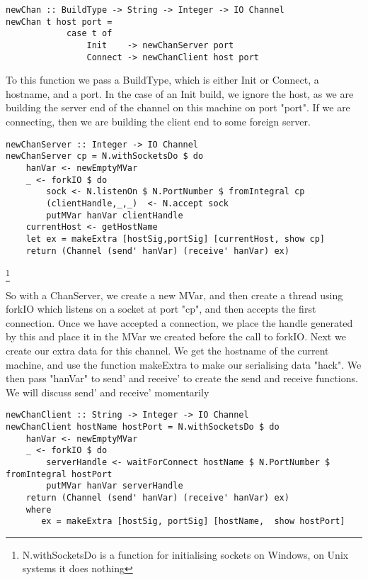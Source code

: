 \begin{verbatim}
newChan :: BuildType -> String -> Integer -> IO Channel
newChan t host port =
            case t of
                Init    -> newChanServer port
                Connect -> newChanClient host port
\end{verbatim}
To this function we pass a BuildType, which is either Init or Connect, a hostname, and a port. In the case of an Init build, we ignore the host, as we are building the server end of the channel on this machine on port "port". If we are connecting, then we are building the client end to some foreign server.

\begin{verbatim}
newChanServer :: Integer -> IO Channel
newChanServer cp = N.withSocketsDo $ do
    hanVar <- newEmptyMVar
    _ <- forkIO $ do
        sock <- N.listenOn $ N.PortNumber $ fromIntegral cp
        (clientHandle,_,_)  <- N.accept sock
        putMVar hanVar clientHandle
    currentHost <- getHostName
    let ex = makeExtra [hostSig,portSig] [currentHost, show cp]
    return (Channel (send' hanVar) (receive' hanVar) ex)
\end{verbatim}
\footnote{N.withSocketsDo is a function for initialising sockets on Windows, on Unix systems it does nothing}

So with a ChanServer, we create a new MVar, and then create a thread using forkIO \cite{hack:io} which listens on a socket at port "cp", and then accepts the first connection. Once we have accepted a connection, we place the handle generated by this and place it in the MVar we created before the call to forkIO. Next we create our extra data for this channel. We get the hostname of the current machine, and use the function makeExtra to make our serialising data "hack". We then pass
"hanVar" to send' and receive' to create the send and receive functions.
We will discuss send' and receive' momentarily

\begin{verbatim}
newChanClient :: String -> Integer -> IO Channel
newChanClient hostName hostPort = N.withSocketsDo $ do
    hanVar <- newEmptyMVar
    _ <- forkIO $ do
        serverHandle <- waitForConnect hostName $ N.PortNumber $ fromIntegral hostPort
        putMVar hanVar serverHandle
    return (Channel (send' hanVar) (receive' hanVar) ex)
    where
       ex = makeExtra [hostSig, portSig] [hostName,  show hostPort]
\end{verbatim}

